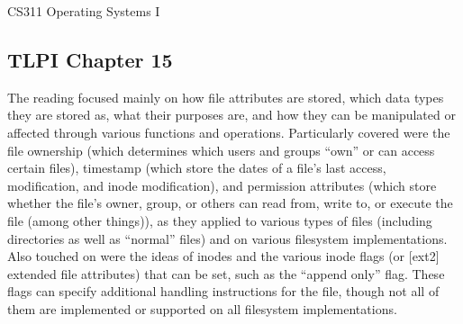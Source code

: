 \documentclass[letterpaper,10pt,fleqn]{article}
\numberwithin{equation}{section}
\begin{document}



{\Large CS311 Operating Systems I}

\subsection*{TLPI Chapter 15}

The reading focused mainly on how file attributes are stored, which data types they are stored as, what their purposes are, and how they can be manipulated or affected through various functions and operations.  Particularly covered were the file ownership (which determines which users and groups ``own'' or can access certain files), timestamp (which store the dates of a file's last access, modification, and inode modification), and permission attributes (which store whether the file's owner, group, or others can read from, write to, or execute the file (among other things)), as they applied to various types of files (including directories as well as ``normal'' files) and on various filesystem implementations.  Also touched on were the ideas of inodes and the various inode flags (or [ext2] extended file attributes) that can be set, such as the ``append only'' flag.  These flags can specify additional handling instructions for the file, though not all of them are implemented or supported on all filesystem implementations.
\end{document}
